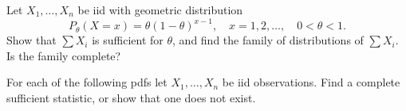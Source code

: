 \documentclass[12pt,letterpaper]{exam}
\begin{document}
\begin{questions}
	
	\begin{solution}
		\begin{parts}
			\part
			\part
		\end{parts}
	\end{solution}
	
	\setcounter{question}{16}
	\question 
	Let \(X_1, \ldots, X_n\) be iid with geometric distribution
	\[
		P_\theta(X=x) =\theta(1-\theta)^{x-1}, \quad x=1,2,\ldots, \quad 0<\theta<1.
	\]
	Show that \(\sum X_i\) is sufficient for \(\theta\), and find the family of distributions of \(\sum X_i\). 
	Is the family complete?
	
	\begin{solution}
		
	\end{solution}
	
	\setcounter{question}{19}
	\question 
	For each of the following pdfs let \(X_1, \ldots, X_n\) be iid observations. 
	Find a complete sufficient statistic, or show that one does not exist.
\end{questions}
\end{document}
